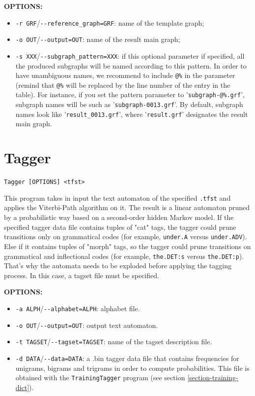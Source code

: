 \bigskip
\noindent \textbf{OPTIONS:}
\begin{itemize}
  \item \verb+-r GRF+/\verb+--reference_graph=GRF+: name of the template graph;
  
  \item \verb+-o OUT+/\verb+--output=OUT+: name of the result main graph;
  
  \item \verb+-s XXX+/\verb+--subgraph_pattern=XXX+: if this optional parameter
  if specified, all the produced subgraphs will be named according to this pattern. 
  In order to have unambiguous names, we recommend to include \verb+@%+ in the parameter 
  (remind that \verb+@%+ will be replaced by the line number of the entry in the table). 
  For instance, if you set the pattern parameter to '\verb+subgraph-@%.grf+', 
  subgraph names will be such as '\verb+subgraph-0013.grf+'. By default,
  subgraph names look like '\verb+result_0013.grf+', where '\verb+result.grf+' 
  designates the result main graph.
\end{itemize}






\section{Tagger}
\verb+Tagger [OPTIONS] <tfst>+
\label{section-Tagger}

\bigskip
\noindent This program takes in input the text automaton of the specified \verb+.tfst+ and applies
the Viterbi-Path algorithm on it. The result is a linear automaton pruned by a probabilistic way based on
a second-order hidden Markov model. If the specified tagger data file contains tuples of "cat" tags,
the tagger could prune transitions only on grammatical codes (for example, \verb+under.A+ versus \verb+under.ADV+).
Else if it contains tuples of "morph" tags, so the tagger could prune transitions on grammatical 
and inflectional codes (for example, \verb+the.DET:s+ versus \verb+the.DET:p+). That's why the automata needs to be 
exploded before applying the tagging process. In this case, a tagset file must be specified.

\bigskip
\noindent \textbf{OPTIONS:}
\begin{itemize}
  \item \verb+-a ALPH+/\verb+--alphabet=ALPH+: alphabet file.
  \item \verb+-o OUT+/\verb+--output=OUT+: output text automaton.
  \item \verb+-t TAGSET+/\verb+--tagset=TAGSET+: name of the tagset description file.
  \item \verb+-d DATA+/\verb+--data=DATA+: a .bin tagger data file that contains frequencies 
  for unigrams, bigrams and trigrams in order to compute probabilities. This file is obtained with 
  the \verb+TrainingTagger+ program (see section \ref{section-training-dict}).
\end{itemize}





